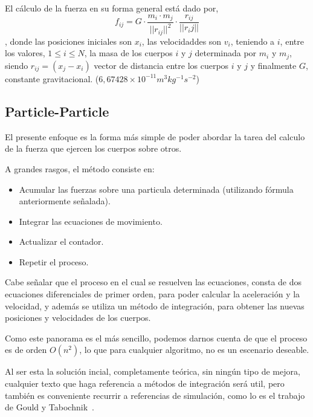 


El cálculo de la fuerza en su forma general está dado por,
$$f_{ij} =G \cdot \frac{m_i \cdot m_j}{||r_{ij}||^{2}} \cdot \frac{r_{ij}}{||r_ij||}$$,
donde las posiciones iniciales son $x_i$,
las velocidaddes son $v_i$,
teniendo a $i$, entre los valores, $1 \leq i \leq N$,
la masa de los cuerpos $i$ y $j$ determinada por $m_i$ y $m_j$,
siendo $r_{ij} = (x_j - x_i )$ vector de distancia entre los cuerpos $i$ y $j$
y finalmente $G$, constante gravitacional. ($6,67428 \times 10^{-11} m^{3} kg^{-1} s^{-2}$)


\subsection{Particle-Particle}

El presente enfoque es la forma más simple de poder abordar
la tarea del calculo de la fuerza que ejercen los cuerpos sobre otros.

A grandes rasgos, el método consiste en:
\begin{itemize}
	\item Acumular las fuerzas sobre una particula determinada (utilizando fórmula anteriormente señalada).
	\item Integrar las ecuaciones de movimiento.
	\item Actualizar el contador.
	\item Repetir el proceso.
\end{itemize}

Cabe señalar que el proceso en el cual se resuelven las ecuaciones,
consta de dos ecuaciones diferenciales de primer orden,
para poder calcular la aceleración y la velocidad,
y además se utiliza un método de integración, para obtener
las nuevas posiciones y velocidades de los cuerpos.

Como este panorama es el más sencillo,
podemos darnos cuenta de que el proceso es de orden $O(n^{2})$,
lo que para cualquier algoritmo, no es un escenario
deseable.

Al ser esta la solución incial, completamente teórica,
sin ningún tipo de mejora, cualquier texto que haga
referencia a métodos de integración será util,
pero también es conveniente recurrir a referencias
de simulación, como lo es el trabajo de Gould y Tabochnik~.


